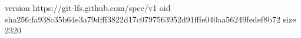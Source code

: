 version https://git-lfs.github.com/spec/v1
oid sha256:fa938c35b64e3a79dfff3822d17c0797563952d91fffe040aa56249fedef8b72
size 2320
